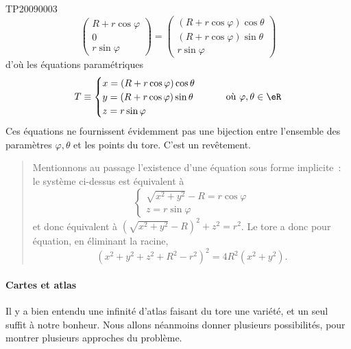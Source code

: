 \begin{corrige}{TP20090003}
\begin{equation*}
		\begin{pmatrix}
			R + r\cos \varphi \\
			0                 \\
			r \sin \varphi
		\end{pmatrix}
		=
		\begin{pmatrix}
			(R + r\cos \varphi) \cos \theta \\
			(R + r\cos \varphi) \sin \theta \\
			r \sin \varphi
		\end{pmatrix}
	\end{equation*}
	d'où les équations paramétriques
	\begin{equation}\label{torus_parameq}
		T \equiv
		\begin{cases}
			x = (R + r\cos \varphi) \cos \theta \\
			y = (R + r\cos \varphi) \sin \theta \\
			z = r \sin \varphi
		\end{cases} \qquad \text{où }\varphi,\theta \in \eR
	\end{equation}
	Ces équations ne fournissent évidemment pas une bijection entre
	l'ensemble des paramètres $\varphi,\theta$ et les points du tore. C'est
	un revêtement.

	\begin{quote}
		Mentionnons au passage l'existence d'une équation sous forme
		implicite~: le système ci-dessus est équivalent à
		\begin{equation*}
			\begin{cases}
				\sqrt{x^2+y^2} - R = r \cos \varphi \\
				z = r \sin \varphi
			\end{cases}
		\end{equation*}
		et donc équivalent à $(\sqrt{x^2+y^2} - R)^2 + z^2 = r^2$. Le tore a
		donc pour équation, en éliminant la racine,
		\begin{equation*}
			(x^2 + y^2 + z^2 + R^2 - r^2)^2 = 4 R^2 (x^2+y^2).
		\end{equation*}
	\end{quote}

	\paragraph{Cartes et atlas}
	Il y a bien entendu une infinité d'atlas faisant du tore une variété,
	et un seul suffit à notre bonheur. Nous allons néanmoins donner
	plusieurs possibilités, pour montrer plusieurs approches du
	problème.


\end{corrige}
